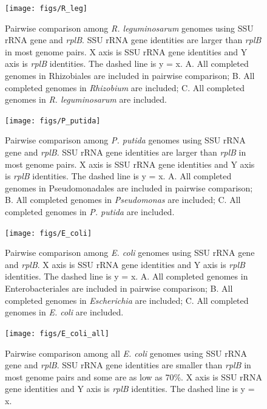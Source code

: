 \documentclass[]{msu-thesis}
\begin{document}
\begin{figure}[tbph!]
  \centering
  \texttt{[image: figs/R\_leg]}
  \caption[Pairwise comparison among \textit{R. leguminosarum} genomes using SSU rRNA gene and \textit{rplB}]{Pairwise comparison among \textit{R. leguminosarum} genomes using SSU rRNA gene and \textit{rplB}. SSU rRNA gene identities are larger than \textit{rplB} in most genome pairs. X axis is SSU rRNA gene identities and Y axis is \textit{rplB} identities. The dashed line is y = x. A. All completed genomes in Rhizobiales are included in pairwise comparison; B. All completed genomes in \textit{\textit{Rhizobium}} are included; C. All completed genomes in \textit{R. leguminosarum} are included.}
  \label{fig:RLeg}
\end{figure}


\begin{figure}[tbph!]
  \centering
  \texttt{[image: figs/P\_putida]}
  \caption[Pairwise comparison among \textit{P. putida} genomes using SSU rRNA gene and \textit{rplB}]{Pairwise comparison among \textit{P. putida} genomes using SSU rRNA gene and \textit{rplB}. SSU rRNA gene identities are larger than \textit{rplB} in most genome pairs. X axis is SSU rRNA gene identities and Y axis is \textit{rplB} identities. The dashed line is y = x. A. All completed genomes in Pseudomonadales are included in pairwise comparison; B. All completed genomes in \textit{Pseudomonas} are included; C. All completed genomes in \textit{P. putida} are included.}
  \label{fig:PPutida}
\end{figure}


\begin{figure}[tbph!]
  \centering
  \texttt{[image: figs/E\_coli]}
  \caption[Pairwise comparison among \textit{E. coli} genomes using SSU rRNA gene and \textit{rplB}]{Pairwise comparison among \textit{E. coli} genomes using SSU rRNA gene and \textit{rplB}. X axis is SSU rRNA gene identities and Y axis is \textit{rplB} identities. The dashed line is y = x. A. All completed genomes in Enterobacteriales are included in pairwise comparison; B. All completed genomes in \textit{Escherichia} are included; C. All completed genomes in \textit{E. coli} are included.}
  \label{fig:EColi}
\end{figure}


\begin{figure}[tbph!]
  \centering
  \texttt{[image: figs/E\_coli\_all]}
  \caption[Pairwise comparison among all \textit{E. coli} genomes using SSU rRNA gene and \textit{rplB}]{Pairwise comparison among all \textit{E. coli} genomes using SSU rRNA gene and \textit{rplB}. SSU rRNA gene identities are smaller than \textit{rplB} in most genome pairs and some are as low as 70\%. X axis is SSU rRNA gene identities and Y axis is \textit{rplB} identities. The dashed line is y = x. }
  \label{fig:EColiAll}
\end{figure}
\end{document}
